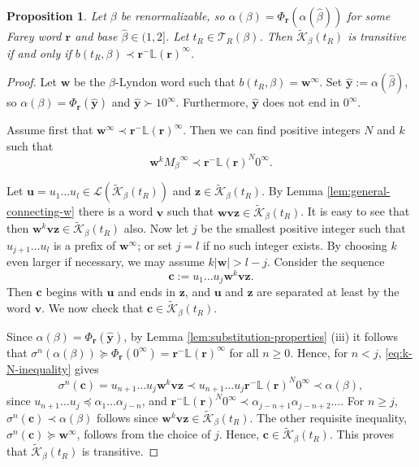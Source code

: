\documentclass[11pt]{amsart}
\newtheorem{proposition}[theorem]{Proposition}
\theoremstyle{definition}
\theoremstyle{remark}
\numberwithin{equation}{section}
\renewcommand{\L}{\ensuremath{\mathbb{L}}}
\newcommand{\Kt}{\widetilde{\mathcal{K}}}
\renewcommand{\c}{ {\mathbf{c}}}
\renewcommand{\r}{ {\mathbf{r}}}
\newcommand{\cL}{\mathcal{L}}
\renewcommand{\u}{\mathbf{u}}
\renewcommand{\v}{\mathbf{v}}
\newcommand{\w}{\mathbf{w}}
\newcommand{\y}{\mathbf{y}}
\newcommand{\z}{\mathbf{z}}
\newcommand{\f}{\infty}
\newcommand{\al}{\alpha}
\newcommand{\lle}{\preccurlyeq}
\newcommand{\lge}{\succcurlyeq}
\begin{document}
\begin{proposition} \label{prop:general-transitivity}
Let $\beta$ be renormalizable, so $\al(\beta)=\Phi_\r(\al(\hat{\beta}))$ for some Farey word $\r$ and base $\hat{\beta}\in(1,2]$. Let $t_R\in\mathcal{T}_R(\beta)$. Then $\Kt_\beta(t_R)$ is transitive if and only if $b(t_R,\beta)\prec \r^-\L(\r)^\f$.
\end{proposition}

\begin{proof}%
Let $\w$ be the $\beta$-Lyndon word such that $b(t_R,\beta)=\w^\f$.  %
Set $\hat{\y}:=\al(\hat{\beta})$, so $\alpha(\beta)=\Phi_\r(\hat{\y})$ and $\hat{\y}\succ 10^\f$. {Furthermore, $\hat{\y}$ does not end in $0^\f$.}

Assume first that $\w^\f\prec \r^-\L(\r)^\f$. Then we can find positive integers $N$ and $k$ such that
\begin{equation} \label{eq:k-N-inequality}
\w^k {M_\beta}^\f\prec \r^-\L(\r)^N 0^\f.
\end{equation}

Let $\u=u_1\dots u_l\in\cL(\Kt_\beta(t_R))$ and $\z\in \Kt_\beta(t_R)$. By Lemma \ref{lem:general-connecting-w} there is a word $\v$ such that $\w\v\z\in \Kt_\beta(t_R)$. It is easy to see that then $\w^k\v\z\in \Kt_\beta(t_R)$ also. Now let $j$ be the smallest positive integer such that $u_{j+1}\dots u_l$ is a prefix of $\w^\f$; or set $j=l$ if no such integer exists.
By choosing $k$ even larger if necessary, we may assume $k|\w|>l-j$. Consider the sequence
\[
\c:=u_1\dots u_j \w^k\v\z.
\]
Then $\c$ begins with $\u$ and ends in $\z$, and $\u$ and $\z$ are separated at least by the word $\v$. We now check that $\c\in\Kt_\beta(t_R)$.

Since $\alpha(\beta)=\Phi_\r(\hat{\y})$, by Lemma \ref{lem:substitution-properties} (iii) it follows that $\sigma^n(\alpha(\beta))\lge \Phi_\r(0^\f)=\r^-\L(\r)^\f$ for all $n\geq 0$. Hence, for $n<j$, \eqref{eq:k-N-inequality} gives
\[
\sigma^n(\c)=u_{n+1}\dots u_j \w^k\v\z\prec u_{n+1}\dots u_j \r^-\L(\r)^N 0^\f\prec\alpha(\beta),
\]
since $u_{n+1}\dots u_j\lle\alpha_1\dots\alpha_{j-n}$, and $\r^-\L(\r)^N 0^\f\prec \alpha_{j-n+1}\alpha_{j-n+2}\dots$.
For $n\geq j$, $\sigma^n(\c)\prec\alpha(\beta)$ follows since $\w^k\v\z\in\Kt_\beta(t_R)$. The other requisite inequality, $\sigma^n(\c)\lge \w^\f$, follows from the choice of $j$. Hence, $\c\in\Kt_\beta(t_R)$. This proves that $\Kt_\beta(t_R)$ is transitive.


\end{proof}
\end{document}
